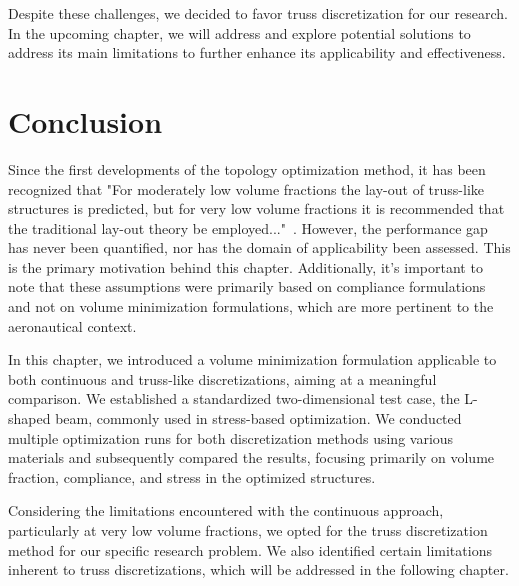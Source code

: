 Despite these challenges, we decided to favor truss discretization for our research. In the upcoming chapter, we will address and explore potential solutions to address its main limitations to further enhance its applicability and effectiveness.

\section{Conclusion}
Since the first developments of the topology optimization method, it has been recognized that "For moderately low volume fractions the lay-out of truss-like structures is predicted, but for very low volume fractions it is recommended that the traditional lay-out theory be employed..."~. However, the performance gap has never been quantified, nor has the domain of applicability been assessed. This is the primary motivation behind this chapter. Additionally, it's important to note that these assumptions were primarily based on compliance formulations and not on volume minimization formulations, which are more pertinent to the aeronautical context.

In this chapter, we introduced a volume minimization formulation applicable to both continuous and truss-like discretizations, aiming at a meaningful comparison. We established a standardized two-dimensional test case, the L-shaped beam, commonly used in stress-based optimization. We conducted multiple optimization runs for both discretization methods using various materials and subsequently compared the results, focusing primarily on volume fraction, compliance, and stress in the optimized structures.

Considering the limitations encountered with the continuous approach, particularly at very low volume fractions, we opted for the truss discretization method for our specific research problem. We also identified certain limitations inherent to truss discretizations, which will be addressed in the following chapter.